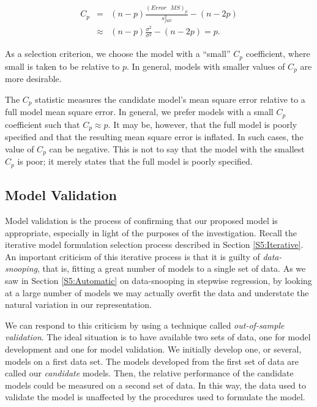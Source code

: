 \begin{center}
\begin{eqnarray*}
C_{p} &=&(n-p)\frac{(Error\text{ }MS)_{p}}{s_{full}^{2}}-(n-2p) \\
&\approx &(n-p)\frac{\sigma ^{2}}{\sigma ^{2}}-(n-2p)=p.
\end{eqnarray*}
\end{center}

As a selection criterion, we choose the model with a ``small''
$C_{p}$ coefficient, where small is taken to be relative to $p$. In
general, models with smaller values of $C_{p}$ are more desirable.

The $C_{p}$ statistic measures the candidate model's mean square error
relative to a full model mean square error. In general, we prefer models
with a small $C_{p}$ coefficient such that $C_{p}\approx p$. It may be,
however, that the full model is poorly specified and that the resulting mean
square error is inflated. In such cases, the value of $C_{p}$ can be
negative. This is not to say that the model with the smallest $C_{p}$ is
poor; it merely states that the full model is poorly specified.

\subsection{Model Validation}\label{S5:ModelValidation}

Model validation is the process of confirming that our proposed
model is appropriate, especially in light of the purposes of the
investigation. Recall the iterative model formulation selection
process described in Section \ref{S5:Iterative}. An important
criticism of this iterative process is that it is guilty of
\emph{data-snooping}, that is, fitting a great number of models to a
single set of data. As we saw in Section \ref{S5:Automatic} on
data-snooping in stepwise regression, by looking at a large number
of models we may actually overfit the data and understate the
natural variation in our representation.

We can respond to this criticism by using a technique called
\textit{out-of-sample} \textit{validation}. The ideal situation is
to have available two sets of data, one for model development and
one for model validation. We initially develop one, or several,
models on a first data set. The models developed from the first set
of data are called our \emph{candidate} models. Then, the relative
performance of the candidate models could be measured on a second
set of data. In this way, the data used to validate the model is
unaffected by the procedures used to formulate the model.

